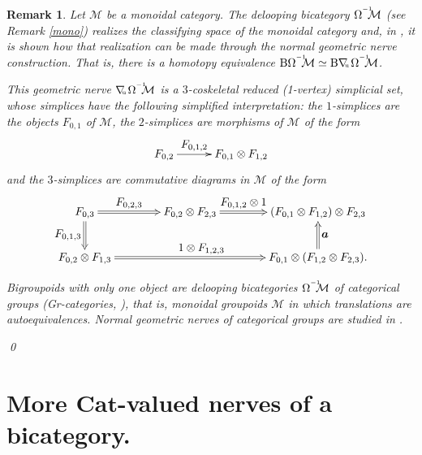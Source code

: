 \documentclass[]{amsart}
\newtheorem{remark}[theorem]{Remark}
\begin{document}
\begin{remark}{\em \label{e2} Let ${\ensuremath{\mathcal{M}}}$ be a monoidal category. The delooping bicategory  $\Omega^{^{-1}}\hspace{-5pt}{\ensuremath{\mathcal{M}}}$ (see Remark  \ref{mono}) realizes the classifying space of the monoidal category and, in \cite{b-c2}, it is shown how that realization can be made through the normal geometric nerve construction. That is, there is a homotopy equivalence ${\ensuremath{\mathrm{B}}} \Omega^{^{-1}}\hspace{-5pt}{\ensuremath{\mathcal{M}}}\simeq {\ensuremath{\mathrm{B}}}\nabla\hspace{-2.5pt}_{^{_\mathrm{u}}}\Omega^{^{-1}}\hspace{-5pt}{\ensuremath{\mathcal{M}}}$.

This geometric nerve $\nabla\hspace{-2.5pt}_{^{_\mathrm{u}}}\Omega^{^{-1}}\hspace{-5pt}{\ensuremath{\mathcal{M}}}$ is a
$3$-coskeletal reduced (1-vertex) simplicial set, whose simplices have the following simplified
interpretation: the $1$-simplices  are the objects $F_{0,1}$ of ${\ensuremath{\mathcal{M}}}$, the $2$-simplices are
morphisms of ${\ensuremath{\mathcal{M}}}$ of the form
$$
\xymatrix@C=30pt{ F_{0,2}\ar[r]^-{\textstyle F_{0,1,2}}  &  F_{0,1}\otimes F_{1,2} }
$$
and the $3$-simplices are commutative diagrams in ${\ensuremath{\mathcal{M}}}$ of the form
$$
\xymatrix@C=40pt{F_{0,3}\ar@{=>}[r]^-{\textstyle {F}_{{0,2,3}}} \ar@{=>}[d]_{\textstyle
{F}_{{0,1,3}}}&F_{0,2}\otimes F_{2,3} \ar@{=>}[r]^-{\textstyle {F}_{{0,1,2}}\otimes 1}
&(F_{0,1}\otimes F_{1,2})\otimes F_{2,3}\\ F_{0,2}\otimes F_{1,3}\ar@{=>}[rr]^{\textstyle 1\otimes
F_{{1,2,3}}}& &F_{0,1}\otimes (F_{1,2}\otimes F_{2,3}). \ar@{=>}[u]_{\textstyle \boldsymbol{a}} }
$$

 Bigroupoids with only one object are delooping bicategories  $\Omega^{^{-1}}\hspace{-5pt}{\ensuremath{\mathcal{M}}}$ of {\em categorical groups} \cite{joyal} (Gr-categories, \cite{bre92}), that is, monoidal groupoids ${\ensuremath{\mathcal{M}}}$ in which translations are autoequivalences. Normal geometric nerves of categorical groups are studied in \cite{Ca-Ceg, ceg-gar}.
 }\qed
\end{remark}

\section{More ${\ensuremath{\mathbf{Cat}}}$-valued nerves of a bicategory.}
\end{document}
